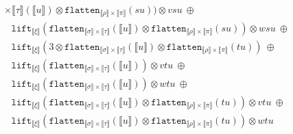\documentclass[a4paper,UKenglish,cleveref,autoref,numberwithinsect]{lipics-v2019}
\theoremstyle{definition}
\newcommand{\flatten}{\mathtt{flatten}}
\newcommand{\lift}{\mathtt{lift}}
\newcommand{\typeinterpret}[1]{\llbracket #1 \rrbracket}
\newcommand{\interpret}[1]{\llbracket #1 \rrbracket}
\begin{document}
\begin{itemize}
\[\begin{array}{l}
{    \times \typeinterpret{\tau}}(\interpret{u}) \otimes
    \flatten_{\typeinterpret{\rho} \times
    \typeinterpret{\pi}}(su)) \otimes vsu\ \oplus \\
  \phantom{A}
    \lift_{\typeinterpret{\xi}}(\flatten_{\typeinterpret{\sigma}
    \times \typeinterpret{\tau}}(\interpret{u}) \otimes
    \flatten_{\typeinterpret{\rho}
    \times \typeinterpret{\pi}}(su)) \otimes wsu\ \oplus \\
  \phantom{A}
    \lift_{\typeinterpret{\xi}}(3 \otimes \flatten_{
    \typeinterpret{\sigma} \times \typeinterpret{\tau}}(
    \interpret{u}) \otimes \flatten_{
    \typeinterpret{\rho} \times \typeinterpret{\pi}}(tu))\ \oplus \\
  \phantom{A}
    \lift_{\typeinterpret{\xi}}(\flatten_{\typeinterpret{\sigma}
    \times \typeinterpret{\tau}}(\interpret{u})) \otimes vtu\ \oplus \\
  \phantom{A}
    \lift_{\typeinterpret{\xi}}(\flatten_{\typeinterpret{\sigma}
    \times \typeinterpret{\tau}}(\interpret{u})) \otimes wtu\ \oplus \\
  \phantom{A}
    \lift_{\typeinterpret{\xi}}(\flatten_{\typeinterpret{\sigma}
    \times \typeinterpret{\tau}}(\interpret{u}) \otimes
    \flatten_{\typeinterpret{\rho} \times
    \typeinterpret{\pi}}(tu)) \otimes vtu\ \oplus \\
  \phantom{A}
    \lift_{\typeinterpret{\xi}}(\flatten_{\typeinterpret{\sigma}
    \times \typeinterpret{\tau}}(\interpret{u}) \otimes
    \flatten_{\typeinterpret{\rho}
    \times \typeinterpret{\pi}}(tu)) \otimes wtu
  \end{array}
  \]


\end{itemize}
\end{document}
